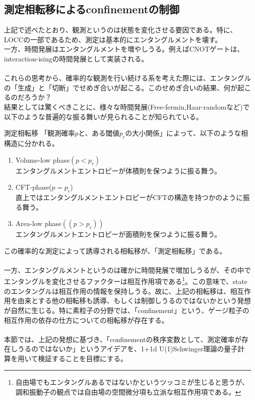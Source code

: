 \documentclass[a4paper,10.5pt]{article}
\numberwithin{equation}{section}
\begin{document}
\begin{enumerate}
\subsection{測定相転移によるconfinementの制御}
上記で述べたとおり、観測というのは状態を変化させる要因である。特に、LOCCの一部であるため、測定は基本的にエンタングルメントを壊す。\\
一方、時間発展はエンタングルメントを増やしうる。例えばCNOTゲートは、interaction-isingの時間発展として実装される。\\
\\
これらの思考から、確率的な観測を行い続ける系を考えた際には、エンタングルの「生成」と「切断」でせめぎ合いが起こる。このせめぎ合いの結果、何が起こるのだろうか？\\
結果としては驚くべきことに、様々な時間発展(Free-fermin,Haar-randomなど)で以下のような普遍的な振る舞いが見られることが知られている。
\begin{resultbox}{測定相転移}
    「観測確率$p$と、ある閾値$p_{c}$の大小関係」によって、以下のような相構造に分かれる。
    \begin{enumerate}
        \item Volume-low phase$(p<p_{c})$\\
        エンタングルメントエントロピーが体積則を保つように振る舞う。
        \item CFT-phase($p=p_{c}$)\\
        直上ではエンタングルメントエントロピーがCFTの構造を持つかのように振る舞う。
        \item Area-low phase$((p>p_{c}))$\\
        エンタングルメントエントロピーが面積則を保つように振る舞う。
    \end{enumerate}
\end{resultbox}
この確率的な測定によって誘導される相転移が、「測定相転移」である。\\
\\
一方、エンタングルメントというのは確かに時間発展で増加しうるが、その中でエンタングルを変化させるファクターは相互作用項である\footnote{自由場でもエンタングルあるではないかというツッコミが生じると思うが、調和振動子の観点では自由場の空間微分項も立派な相互作用項である。}。この意味で、stateのエンタングルは相互作用の情報を保持しうる。故に、上記の相転移は、相互作用を由来とする他の相転移も誘導、もしくは制御しうるのではないかという発想が自然に生じる。特に素粒子の分野では、「confinement」という、ゲージ粒子の相互作用の依存の仕方についての相転移が存在する。\\
\\
本節では、上記の発想に基づき、「confinementの秩序変数として、測定確率が存在しうるのではないか」というアイデアを、1+1d U(1)Schwinger理論の量子計算を用いて検証することを目標にする。

\end{enumerate}
\end{document}
